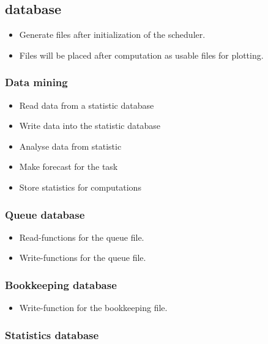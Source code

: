 {	\subsection{database}
	
		\begin{itemize}
			\item Generate files after initialization of the scheduler.
			\item Files will be placed after computation as usable files for plotting.
		\end{itemize}
		
		\subsubsection{Data mining}
	
			\begin{itemize}
				\item Read data from a statistic database
				\item Write data into the statistic database
				\item Analyse data from statistic
				\item Make forecast for the task
				\item Store statistics for computations
			\end{itemize}
	
		\subsubsection{Queue database}
	
			\begin{itemize}
				\item Read-functions for the queue file.
				\item Write-functions for the queue file.
			\end{itemize}
		
		\subsubsection{Bookkeeping database}
	
			\begin{itemize}
				\item Write-function for the bookkeeping file.
			\end{itemize}
	
		\subsubsection{Statistics database}
	
}
